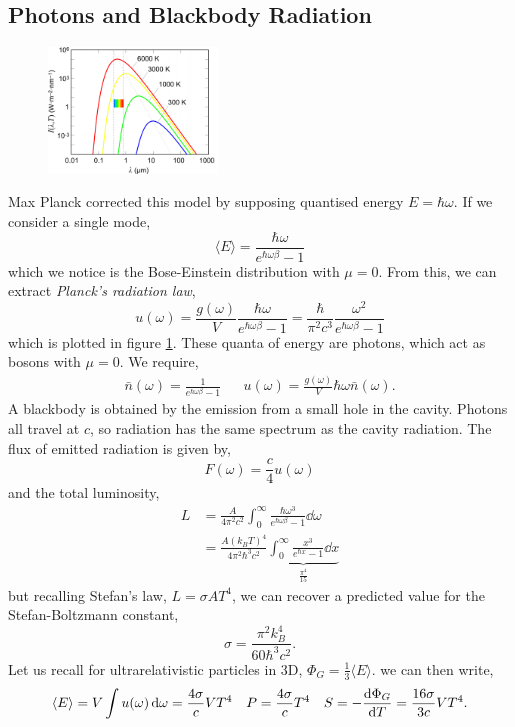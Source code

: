 \documentclass{book}
\begin{document}
\subsection{Photons and Blackbody Radiation}
\begin{figure}[h]
	\centering
	\includegraphics[width=0.4\textwidth]{planck.png}
	\caption{}
	\label{fig:plank}
\end{figure}
Max Planck corrected this model by supposing quantised energy $E = \hbar \omega$. If we consider a single mode,
\begin{equation}
	\langle E \rangle = \frac{\hbar\omega}{e^{\hbar\omega\beta} - 1}
\end{equation}
which we notice is the Bose-Einstein distribution with $\mu = 0$. From this, we can extract \textit{Planck's radiation law},
\begin{equation}
	u(\omega) = \frac{g(\omega)}{V}\frac{\hbar\omega}{e^{\hbar \omega \beta} - 1} = \frac{\hbar}{\pi^2 c^3}\frac{\omega^2}{e^{\hbar\omega\beta} -1}
\end{equation}
which is plotted in figure \ref{fig:plank}. These quanta of energy are photons, which act as bosons with $\mu = 0$. We require,
\begin{align}
	\bar{n}(\omega) = \frac{1}{e^{\hbar\omega\beta}-1} && u(\omega) = \frac{g(\omega)}{V}\hbar\omega\bar{n}(\omega).
\end{align}
A blackbody is obtained by the emission from a small hole in the cavity. Photons all travel at $c$, so radiation has the same spectrum as the cavity radiation. The flux of emitted radiation is given by,
\begin{equation}
	F(\omega) = \frac{c}{4}u(\omega)
\end{equation}
and the total luminosity,
\begin{equation}
	\begin{split}
	L &= \frac{A}{4\pi^2c^2}\int_0^{\infty}\frac{\hbar\omega^3}{e^{\hbar\omega\beta}-1}\dd{\omega}\\
	&= \frac{A(k_BT)^4}{4\pi^2\hbar^3c^2}\underbrace{\int_0^{\infty}\frac{x^3}{e^{\hbar x} -1}\dd{x}}_{\frac{\pi^4}{15}}
	\end{split}
\end{equation}
but recalling Stefan's law, $L = \sigma A T^4$, we can recover a predicted value for the Stefan-Boltzmann constant,
\begin{equation}
	\sigma = \frac{\pi^2k_B^4}{60\hbar^3c^2}.
\end{equation}
Let us recall for ultrarelativistic particles in 3D, $\Phi_G= \frac{1}{3}\langle E \rangle$. we can then write,
\begin{align}
	\langle E \rangle = V\int u(\omega)\dd{\omega} = \frac{4\sigma}{c}VT^4 && P = \frac{4\sigma}{c}T^4 && S = -\dv{\Phi_G}{T} = \frac{16\sigma}{3c}VT^4.
\end{align}
\end{document}
